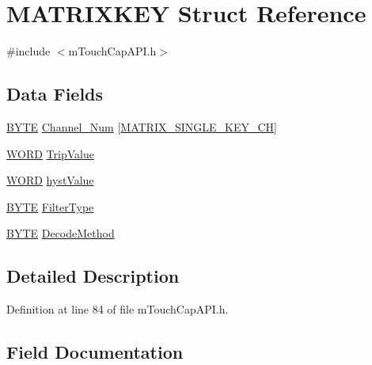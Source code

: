 \hypertarget{struct_m_a_t_r_i_x_k_e_y}{}\section{M\+A\+T\+R\+I\+X\+K\+E\+Y Struct Reference}
\label{struct_m_a_t_r_i_x_k_e_y}


{\ttfamily \#include $<$m\+Touch\+Cap\+A\+P\+I.\+h$>$}

\subsection*{Data Fields}
\begin{DoxyCompactItemize}
\item 
\hyperlink{_generic_type_defs_8h_a4ae1dab0fb4b072a66584546209e7d58}{B\+Y\+T\+E} \hyperlink{struct_m_a_t_r_i_x_k_e_y_ab09f1f6c37206f56faaead3beee6c4d7}{Channel\+\_\+\+Num} \mbox{[}\hyperlink{m_touch_cap_a_p_i_8h_a313f4b1aafbb71bc788c8d9ca2db76bc}{M\+A\+T\+R\+I\+X\+\_\+\+S\+I\+N\+G\+L\+E\+\_\+\+K\+E\+Y\+\_\+\+C\+H}\mbox{]}
\item 
\hyperlink{_generic_type_defs_8h_a2b0e863dadf920709ec53d9088ee7c91}{W\+O\+R\+D} \hyperlink{struct_m_a_t_r_i_x_k_e_y_abc6bec2968b498197fc0e64c3729fb0c}{Trip\+Value}
\item 
\hyperlink{_generic_type_defs_8h_a2b0e863dadf920709ec53d9088ee7c91}{W\+O\+R\+D} \hyperlink{struct_m_a_t_r_i_x_k_e_y_aee26e696540c8197e148cb9f0ccd4551}{hyst\+Value}
\item 
\hyperlink{_generic_type_defs_8h_a4ae1dab0fb4b072a66584546209e7d58}{B\+Y\+T\+E} \hyperlink{struct_m_a_t_r_i_x_k_e_y_a3ed3b2bb276c531333666858f705a254}{Filter\+Type}
\item 
\hyperlink{_generic_type_defs_8h_a4ae1dab0fb4b072a66584546209e7d58}{B\+Y\+T\+E} \hyperlink{struct_m_a_t_r_i_x_k_e_y_a3ec50eb50f016432fd63460deb50d4d3}{Decode\+Method}
\end{DoxyCompactItemize}


\subsection{Detailed Description}


Definition at line 84 of file m\+Touch\+Cap\+A\+P\+I.\+h.



\subsection{Field Documentation}
\hypertarget{struct_m_a_t_r_i_x_k_e_y_ab09f1f6c37206f56faaead3beee6c4d7}{}
